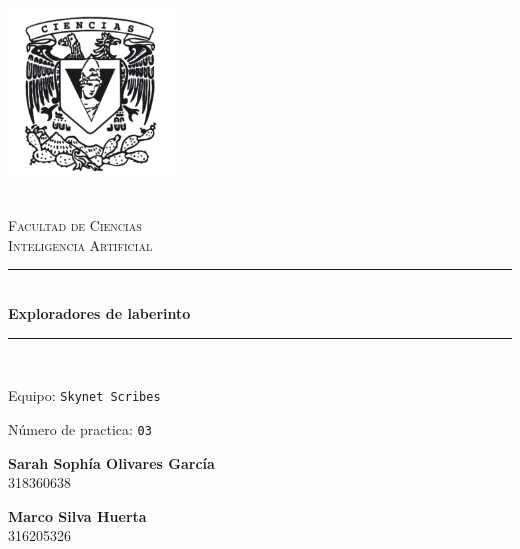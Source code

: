 \begin{titlepage}
\center 
\newcommand{\HRule}{\rule{\linewidth}{0.5mm}} 

\includegraphics[width=4.5cm]{IMA/cienciasWhite.png}

\quad \\[0.2cm]
\textsc{\huge Facultad de Ciencias}\\[.6cm] 
\textsc{\huge Inteligencia Artificial}\\[0.5cm]

\makeatletter
    \HRule \\ [0.4cm]
        { \huge \bfseries Exploradores de laberinto}\\
    \HRule \\ [0.4cm]
    
\vspace{2mm}

\begin{flushleft}
    \Large{Equipo:} \texttt{\Large Skynet Scribes}
\end{flushleft}
\begin{flushleft}
    \Large{Número de practica:} \texttt{\Large 03}\\[0.8cm]
\end{flushleft}


\vspace{5mm}

\begin{minipage}{0.4\textwidth}
        \textbf{\large{Sarah Sophía Olivares García}}\\
        318360638
\end{minipage}
\begin{minipage}{0.4\textwidth}
    \begin{flushright}
        \textbf{\large{Marco Silva Huerta}}\\
        316205326        
    \end{flushright}
\end{minipage}


\end{titlepage}

